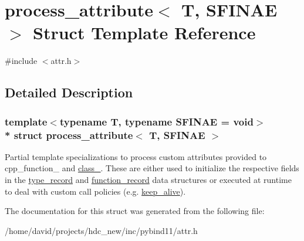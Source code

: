 \hypertarget{structprocess__attribute}{}\section{process\+\_\+attribute$<$ T, S\+F\+I\+N\+AE $>$ Struct Template Reference}
\label{structprocess__attribute}


{\ttfamily \#include $<$attr.\+h$>$}



\subsection{Detailed Description}
\subsubsection*{template$<$typename T, typename S\+F\+I\+N\+AE = void$>$\\*
struct process\+\_\+attribute$<$ T, S\+F\+I\+N\+A\+E $>$}

Partial template specializations to process custom attributes provided to cpp\+\_\+function\+\_\+ and \hyperlink{classclass__}{class\+\_\+}. These are either used to initialize the respective fields in the \hyperlink{structtype__record}{type\+\_\+record} and \hyperlink{structfunction__record}{function\+\_\+record} data structures or executed at runtime to deal with custom call policies (e.\+g. \hyperlink{structkeep__alive}{keep\+\_\+alive}). 

The documentation for this struct was generated from the following file\+:\begin{DoxyCompactItemize}
\item 
/home/david/projects/hdc\+\_\+new/inc/pybind11/attr.\+h\end{DoxyCompactItemize}
